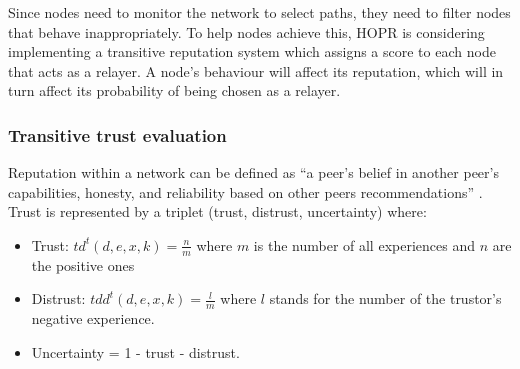 Since nodes need to monitor the network to select paths, they need to filter
nodes that behave inappropriately. To help nodes achieve this, HOPR is considering implementing a
transitive reputation system which assigns a score to each node that acts as a
relayer. A node’s behaviour will affect its reputation, which will in turn affect its probability of
being chosen as a relayer.

\subsubsection*{Transitive trust evaluation }

Reputation within a network can be defined as ``a peer’s belief in another peer’s
capabilities, honesty, and reliability based on other peers recommendations” \cite{Wang_2003}.
Trust is represented by a triplet (trust, distrust, uncertainty) where:

\begin{itemize}

    \item Trust: $td^t(d,e,x,k)=\frac{n}{m}$ where $m$ is the number of all
        experiences and $n$ are the positive ones

    \item Distrust: $tdd^t(d,e,x,k)=\frac{l}{m}$ where $l$ stands for the number
        of the trustor’s negative experience.

    \item Uncertainty = 1 - trust - distrust.

\end{itemize}